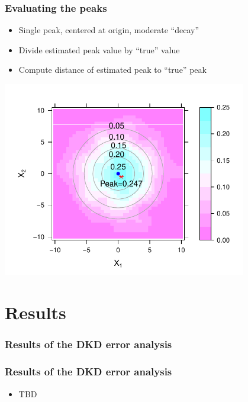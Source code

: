 \documentclass{beamer}
\begin{document}
\begin{frame}\frametitle{Evaluating the peaks}
    \begin{itemize}
        \item Single peak, centered at origin, moderate ``decay''
        \item Divide estimated peak value by ``true'' value
        \item Compute distance of estimated peak to ``true'' peak
    \end{itemize}
    \begin{example}
    \centerline{
        \label{fig:example-peaks}
        \centering
        \includegraphics[width=0.8\textwidth]{example-peaks}
     }
    \end{example}
\end{frame}


\section{Results}

\subsubsection{Results of the DKD error analysis}
\begin{frame}\frametitle{Results of the DKD error analysis}
    \begin{itemize}
        \item TBD
    \end{itemize}
\end{frame}

\end{document}
